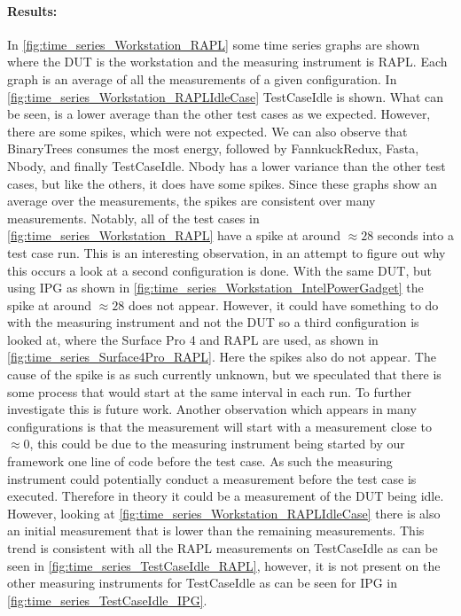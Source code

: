 \paragraph{Results:}
In \cref{fig:time_series_Workstation_RAPL} some time series graphs are shown where the DUT is the workstation and the measuring instrument is RAPL. Each graph is an average of all the measurements of a given configuration. In \cref{fig:time_series_Workstation_RAPLIdleCase} TestCaseIdle is shown. What can be seen, is a lower average than the other test cases as we expected. However, there are some spikes, which were not expected. We can also observe that BinaryTrees consumes the most energy, followed by FannkuckRedux, Fasta, Nbody, and finally TestCaseIdle. Nbody has a lower variance than the other test cases, but like the others, it does have some spikes. Since these graphs show an average over the measurements, the spikes are consistent over many measurements. Notably, all of the test cases in \cref{fig:time_series_Workstation_RAPL} have a spike at around $\approx28$ seconds into a test case run. This is an interesting observation, in an attempt to figure out why this occurs a look at a second configuration is done. With the same DUT, but using IPG as shown in \cref{fig:time_series_Workstation_IntelPowerGadget} the spike at around $\approx28$ does not appear. However, it could have something to do with the measuring instrument and not the DUT so a third configuration is looked at, where the Surface Pro 4 and RAPL are used, as shown in \cref{fig:time_series_Surface4Pro_RAPL}. Here the spikes also do not appear. The cause of the spike is as such currently unknown, but we speculated that there is some process that would start at the same interval in each run. To further investigate this is future work. Another observation which appears in many configurations is that the measurement will start with a measurement close to $\approx0$, this could be due to the measuring instrument being started by our framework one line of code before the test case. As such the measuring instrument could potentially conduct a measurement before the test case is executed. Therefore in theory it could be a measurement of the DUT being idle. However, looking at \cref{fig:time_series_Workstation_RAPLIdleCase} there is also an initial measurement that is lower than the remaining measurements. This trend is consistent with all the RAPL measurements on TestCaseIdle as can be seen in \cref{fig:time_series_TestCaseIdle_RAPL}, however, it is not present on the other measuring instruments for TestCaseIdle as can be seen for IPG in \cref{fig:time_series_TestCaseIdle_IPG}. %


